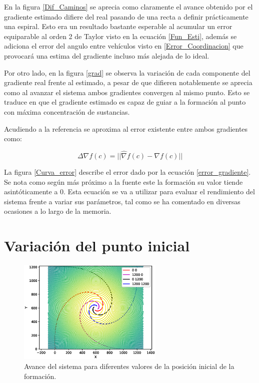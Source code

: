 En la figura \ref{Dif_Caminos} se aprecia como claramente el avance obtenido por el gradiente estimado difiere del real pasando de una recta a definir prácticamente una espiral. Esto era un resultado bastante esperable al acumular un error equiparable al orden 2 de Taylor visto en la ecuación \ref{Fun_Esti}, además se adiciona el error del angulo entre vehículos visto en \ref{Error_Coordinacion} que provocará una estima del gradiente incluso más alejada de lo ideal. 

Por otro lado, en la figura \ref{grad} se observa la variación de cada componente del  gradiente real frente al estimado, a pesar de que difieren notablemente se aprecia como al avanzar el sistema ambos gradientes convergen al mismo punto. Esto se traduce en que el gradiente estimado es capaz de guiar a la formación al punto con máxima concentración de sustancias.

Acudiendo a la referencia \cite{Estimacion_Gradiente} se aproxima al error existente entre ambos gradientes como:

\begin{equation} \label{error_gradiente}
	\Delta{\nabla{f\left(c\right)}}=||\hat{\nabla}f\left(c\right)-\nabla{f}\left(c\right)||
\end{equation}

La figura \ref{Curva_error} describe el error dado por la ecuación \ref{error_gradiente}. Se nota como según más próximo a la fuente este la formación su valor tiende asintóticamente a 0. Esta ecuación se va a utilizar para evaluar el rendimiento del sistema frente a variar sus parámetros, tal como se ha comentado en diversas ocasiones a lo largo de la memoria.

\section{Variación del punto inicial}
\begin{figure}[H]
\centering
\includegraphics[width=0.62\textwidth]{figures/4_puntos_observar_forma/Figure_1.eps}
\caption{Avance del sistema para diferentes valores de la posición inicial de la formación.} \label{Avance_Posicion}
\end{figure}


